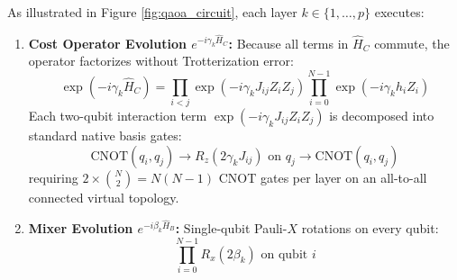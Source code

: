 As illustrated in Figure \ref{fig:qaoa_circuit}, each layer $k \in \{1, \dots, p\}$ executes:
\begin{enumerate}
    \item \textbf{Cost Operator Evolution $e^{-i \gamma_k \hat{H}_C}$:}
    Because all terms in $\hat{H}_C$ commute, the operator factorizes without Trotterization error:
    \begin{equation}
    \exp\left(-i \gamma_k \hat{H}_C\right) = \prod_{i < j} \exp\left(-i \gamma_k J_{ij} Z_i Z_j\right) \prod_{i=0}^{N-1} \exp\left(-i \gamma_k h_i Z_i\right)
    \end{equation}
    Each two-qubit interaction term $\exp(-i \gamma_k J_{ij} Z_i Z_j)$ is decomposed into standard native basis gates:
    \begin{equation}
    \text{CNOT}(q_i, q_j) \longrightarrow R_z(2\gamma_k J_{ij}) \text{ on } q_j \longrightarrow \text{CNOT}(q_i, q_j)
    \end{equation}
    requiring $2 \times \binom{N}{2} = N(N-1)$ CNOT gates per layer on an all-to-all connected virtual topology.
    
    \item \textbf{Mixer Evolution $e^{-i \beta_k \hat{H}_B}$:}
    Single-qubit Pauli-$X$ rotations on every qubit:
    \begin{equation}
    \prod_{i=0}^{N-1} R_x(2\beta_k) \text{ on qubit } i
    \end{equation}
\end{enumerate}

